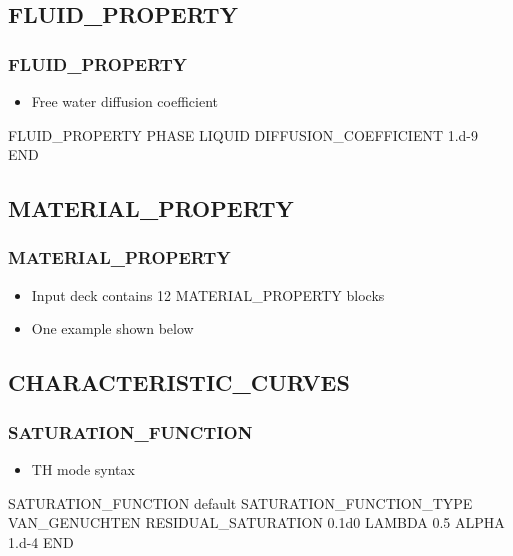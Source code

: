 \documentclass{beamer}
\begin{document}
\subsection{FLUID\_PROPERTY}

\begin{frame}[fragile]\frametitle{FLUID\_PROPERTY}
\begin{itemize}
  \item Free water diffusion coefficient
\end{itemize}

\begin{semiverbatim}
FLUID_PROPERTY
  PHASE LIQUID
  DIFFUSION_COEFFICIENT 1.d-9
END
\end{semiverbatim}

\end{frame}

\subsection{MATERIAL\_PROPERTY}

\begin{frame}[fragile]\frametitle{MATERIAL\_PROPERTY}
\begin{itemize}
  \item Input deck contains 12 MATERIAL\_PROPERTY blocks
  \item One example shown below
\end{itemize}

\end{frame}

\subsection{CHARACTERISTIC\_CURVES}

\begin{frame}\frametitle{SATURATION\_FUNCTION}
\begin{itemize}
  \item TH mode syntax
\end{itemize}
\begin{semiverbatim}\small
SATURATION_FUNCTION default
  SATURATION_FUNCTION_TYPE VAN_GENUCHTEN
  RESIDUAL_SATURATION 0.1d0
  LAMBDA 0.5
  ALPHA 1.d-4
END
\end{semiverbatim}
\end{frame}
\end{document}
